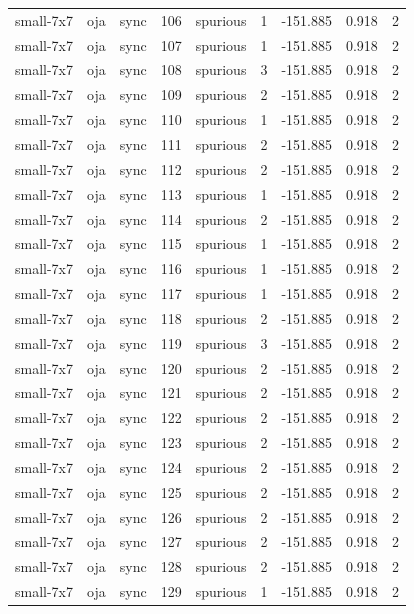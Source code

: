 \begin{tabular}{lllrlrrrr}
small-7x7 & oja & sync & 106 & spurious & 1 & -151.885 & 0.918 & 2 \\
small-7x7 & oja & sync & 107 & spurious & 1 & -151.885 & 0.918 & 2 \\
small-7x7 & oja & sync & 108 & spurious & 3 & -151.885 & 0.918 & 2 \\
small-7x7 & oja & sync & 109 & spurious & 2 & -151.885 & 0.918 & 2 \\
small-7x7 & oja & sync & 110 & spurious & 1 & -151.885 & 0.918 & 2 \\
small-7x7 & oja & sync & 111 & spurious & 2 & -151.885 & 0.918 & 2 \\
small-7x7 & oja & sync & 112 & spurious & 2 & -151.885 & 0.918 & 2 \\
small-7x7 & oja & sync & 113 & spurious & 1 & -151.885 & 0.918 & 2 \\
small-7x7 & oja & sync & 114 & spurious & 2 & -151.885 & 0.918 & 2 \\
small-7x7 & oja & sync & 115 & spurious & 1 & -151.885 & 0.918 & 2 \\
small-7x7 & oja & sync & 116 & spurious & 1 & -151.885 & 0.918 & 2 \\
small-7x7 & oja & sync & 117 & spurious & 1 & -151.885 & 0.918 & 2 \\
small-7x7 & oja & sync & 118 & spurious & 2 & -151.885 & 0.918 & 2 \\
small-7x7 & oja & sync & 119 & spurious & 3 & -151.885 & 0.918 & 2 \\
small-7x7 & oja & sync & 120 & spurious & 2 & -151.885 & 0.918 & 2 \\
small-7x7 & oja & sync & 121 & spurious & 2 & -151.885 & 0.918 & 2 \\
small-7x7 & oja & sync & 122 & spurious & 2 & -151.885 & 0.918 & 2 \\
small-7x7 & oja & sync & 123 & spurious & 2 & -151.885 & 0.918 & 2 \\
small-7x7 & oja & sync & 124 & spurious & 2 & -151.885 & 0.918 & 2 \\
small-7x7 & oja & sync & 125 & spurious & 2 & -151.885 & 0.918 & 2 \\
small-7x7 & oja & sync & 126 & spurious & 2 & -151.885 & 0.918 & 2 \\
small-7x7 & oja & sync & 127 & spurious & 2 & -151.885 & 0.918 & 2 \\
small-7x7 & oja & sync & 128 & spurious & 2 & -151.885 & 0.918 & 2 \\
small-7x7 & oja & sync & 129 & spurious & 1 & -151.885 & 0.918 & 2 \\

\end{tabular}
